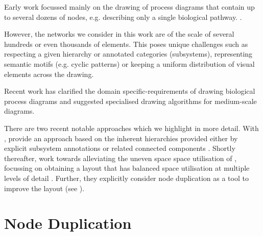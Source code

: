 \documentclass[
	fontsize=10pt, %
	twoside=false, %
	secnumdepth=1, %
  toc=indentunnumbered %
]{kaobook}
\begin{document}
Early work focussed mainly on the drawing of process diagrams that contain up to
several dozens of nodes, e.g. describing only a single biological pathway.
\cite{becker_GraphLayoutAlgorithm_2001}
\cite{schreiber_ComparisonMetabolicPathways_2003}.

However, the networks we consider in this work are of the scale of several
hundreds or even thousands of elements. This poses unique challenges such as
respecting a given hierarchy or annotated categories (subsystems), representing semantic
motifs (e.g. cyclic patterns) or keeping a uniform distribution of visual
elements across the drawing.

Recent work \cite{siebenhaller_HumanlikeLayoutAlgorithms_2020,
  kieffer_HOLAHumanlikeOrthogonal_2016} has clarified the domain
specific-requirements of drawing biological process diagrams and suggested
specialised drawing algorithms for medium-scale diagrams.

There are two recent notable approaches which we highlight in more detail.
With , \citeauthor{wu_MetabopolisScalableNetwork_2019}
provide an approach based on the inherent hierarchies provided either by
explicit subsystem annotations or related connected components
\cite{wu_MetabopolisScalableNetwork_2019}.
%
Shortly thereafter, \citeauthor{wu_MultilevelAreaBalancing_2020} work towards
alleviating the uneven space space utilisation of ,
focussing on obtaining a layout that has balanced space utilisation at multiple
levels of detail \cite{wu_MultilevelAreaBalancing_2020}. Further, they
explicitly consider node duplication as a tool to improve the layout (see ).



\section{Node Duplication}
\label{sec:node-duplication}
\end{document}
